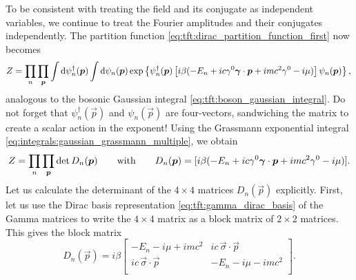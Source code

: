 To be consistent with treating the field and its conjugate as independent variables, we continue to treat the Fourier amplitudes and their conjugates independently.
The partition function \eqref{eq:tft:dirac_partition_function_first} now becomes 
\begin{equation}
	Z %
	  = \prod_n \prod_\vec{p} \int \dif \psi^\dagger_n(\vec{p}) \int \dif \psi_n(\vec{p}) 
	  \exp \left\{ \psi^\dagger_n(\vec{p}) \left[ i \beta ( -E_n + i c \gamma^0 \vec{\gamma} \cdot \vec{p} + i mc^2 \gamma^0 - i \mu ) \right] \psi_n(\vec{p}) \right\} , \\
\label{eq:tft:fermion_gaussian_integral}
\end{equation}
analogous to the bosonic Gaussian integral \eqref{eq:tft:boson_gaussian_integral}.
Do not forget that $\psi^\dagger_n(\vec{p})$ and $\psi_n(\vec{p})$ are four-vectors, sandwiching the matrix to create a scalar action in the exponent!
Using the Grassmann exponential integral \eqref{eq:integrals:gaussian_grassmann_multiple}, we obtain
\begin{equation}
	Z = \prod_n \prod_{\bm{p}} \operatorname{det}{D_n({\bm{p}})}
	\qquad \text{with} \qquad
	D_n({\bm{p}}) = [i \beta( -E_n + i c \gamma^0 {\bm{\gamma}} \cdot {\bm{p}} + i mc^2 \gamma^0 - i \mu )].
\end{equation}
Let us calculate the determinant of the $4 \times 4$ matrices $D_n(\vec{p})$ explicitly.
First, let us use the Dirac basis representation \eqref{eq:tft:gamma_dirac_basis} of the Gamma matrices to write the $4 \times 4$ matrix as a block matrix of $2 \times 2$ matrices.
This gives the block matrix
\begin{equation}
	D_n(\vec{p}) = i \beta \begin{bmatrix}
	                           -E_n - i \mu + i m c^2         & i c \, \vec{\sigma} \cdot \vec{p}    \\ 
	                           i c \, \vec{\sigma} \cdot \vec{p} & -E_n - i \mu - i m c^2 \\ 
	                       \end{bmatrix} .
\end{equation}
